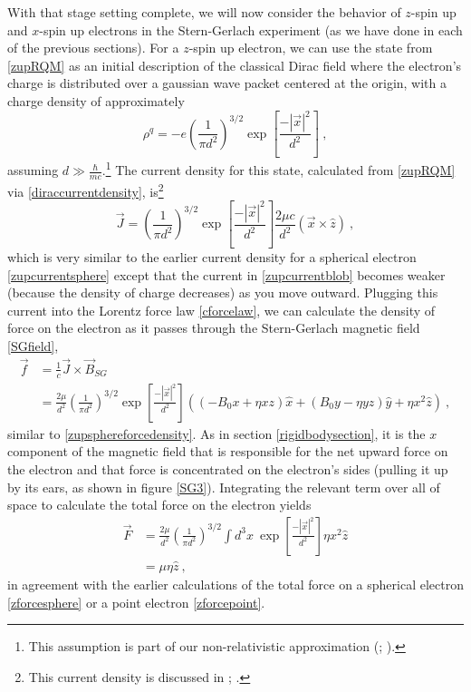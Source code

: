 \documentclass[12pt,secnumarabic,amsmath,amssymb,balancelastpage,nofootinbib]{article}
\begin{document}
With that stage setting complete, we will now consider the behavior of $z$-spin up and $x$-spin up electrons in the Stern-Gerlach experiment (as we have done in each of the previous sections).  For a $z$-spin up electron, we can use the state from \eqref{zupRQM} as an initial description of the classical Dirac field where the electron's charge is distributed over a gaussian wave packet centered at the origin, with a charge density of approximately
\begin{equation}
\rho^q=-e\left(\frac{1}{\pi d^2}\right)^{3/2}\exp\left[\frac{-|\vec{x}|^2}{d^2}\right] 
\ ,
\label{zupchargeblob}
\end{equation}
assuming $d\gg\frac{\hbar}{mc}$.\footnote{This assumption is part of our non-relativistic approximation (\citealp[pg.\ 39]{bjorkendrell}; \citealp[sec.\ 5]{howelectronsspin}).}  The current density for this state, calculated from \eqref{zupRQM} via \eqref{diraccurrentdensity}, is\footnote{This current density is discussed in \citet[sec.\ 4]{ohanian}; \citet[eq.\ 31]{howelectronsspin}.}
\begin{equation}
\vec{J}=\left(\frac{1}{\pi d^2}\right)^{3/2} \exp\left[\frac{-|\vec{x}|^2}{d^2}\right] \frac{2 \mu c}{d^2} (\vec{x} \times \hat{z})
\ ,
\label{zupcurrentblob}
\end{equation}
which is very similar to the earlier current density for a spherical electron \eqref{zupcurrentsphere} except that the current in \eqref{zupcurrentblob} becomes weaker (because the density of charge decreases) as you move outward.  Plugging this current into the Lorentz force law \eqref{cforcelaw}, we can calculate the density of force on the electron as it passes through the Stern-Gerlach magnetic field \eqref{SGfield},
\begin{align}
\vec{f}&=\frac{1}{c} \vec{J} \times \vec{B}_{SG}
\nonumber
\\
&=\frac{2 \mu}{d^2}\left(\frac{1}{\pi d^2}\right)^{3/2} \exp\left[\frac{-|\vec{x}|^2}{d^2}\right] \left( (-B_0 x + \eta x z) \hat{x} + (B_0 y - \eta y z)\hat{y} + \eta x^2 \hat{z} 
\right)
\ ,
\label{zupforcedensityblob}
\end{align}
similar to \eqref{zupsphereforcedensity}.  As in section \ref{rigidbodysection}, it is the $x$ component of the magnetic field that is responsible for the net upward force on the electron and that force is concentrated on the electron's sides (pulling it up by its ears, as shown in figure \ref{SG3}).  Integrating the relevant term over all of space to calculate the total force on the electron yields
\begin{align}
\vec{F} &= \frac{2 \mu}{d^2}\left(\frac{1}{\pi d^2}\right)^{3/2}\int{d^3x\  \exp\left[\frac{-|\vec{x}|^2}{d^2}\right]\eta x^2} \hat{z}
\nonumber
\\
&= \mu \eta \hat{z}
\ ,
\end{align}
in agreement with the earlier calculations of the total force on a spherical electron \eqref{zforcesphere} or a point electron \eqref{zforcepoint}.
\end{document}
